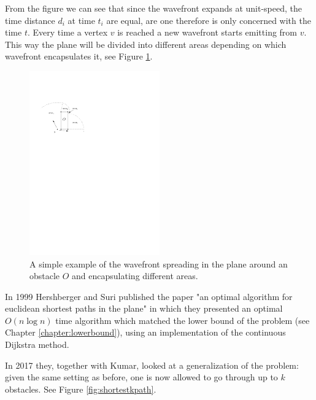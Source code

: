 From the figure we can see that since the wavefront expands at unit-speed, the time distance
$d_i$ at time $t_i$ are equal, are one therefore is only concerned with the time $t$.
Every time a vertex $v$ is reached a new wavefront starts emitting from $v$. This way
the plane will be divided into different areas depending on which wavefront encapsulates it,
see Figure \ref{fig:introductiontowavefront}.

\begin{figure}[H]
    \centering
	\includegraphics[width=0.5\textwidth]{figures/introductiontowavefront.pdf}
	\caption{A simple example of the wavefront spreading in the plane around an obstacle $O$
	         and encapsulating different areas.}
     \label{fig:introductiontowavefront}
\end{figure}

In 1999 Hershberger and Suri published the paper "an optimal algorithm for euclidean shortest 
paths in the plane"\cite{HershbergerS99} in which they presented an optimal $O(n\log n)$ time 
algorithm which matched the lower bound of the problem (see Chapter \ref{chapter:lowerbound}), 
using an implementation of the continuous Dijkstra method.

In 2017 they, together with Kumar, looked at a generalization of the problem:
given the same setting as before, one is now allowed to go through up to $k$ obstacles.
See Figure \ref{fig:shortestkpath}.

